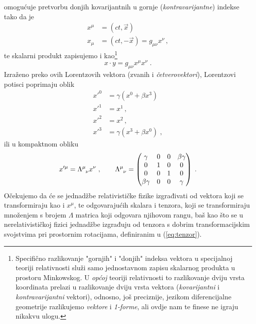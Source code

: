 omogućuje pretvorbu donjih kovarijantnih u gornje (\emph{kontravarijantne})
indekse tako da je
\begin{align}
x^\mu &= (ct, \vec{x}) \\
x_\mu &= (ct,-\vec{x}) = g_{\mu\nu} x^\nu \,,
\end{align}
te skalarni produkt zapisujemo i kao\footnote{Specifično 
razlikovanje "gornjih" i "donjih" indeksa vektora u
specijalnoj teoriji relativnosti služi samo jednostavnom zapisu
skalarnog produkta u prostoru Minkowskog.
U \emph{općoj} teoriji relativnosti to razlikovanje dviju vrsta
koordinata prelazi u razlikovanje dviju vrsta vektora 
(\emph{kovarijantni} i \emph{kontravarijantni} vektori), odnosno,
još preciznije, jezikom diferencijalne geometrije razlikujemo 
\emph{vektore} i \emph{1-forme}, ali ovdje nam te finese ne igraju
nikakvu ulogu.}
\begin{equation}
     x \cdot y = g_{\mu\nu} x^{\mu}x^{\nu} \;.
\end{equation}
Izraženo preko ovih Lorentzovih vektora (zvanih i \emph{četverovektori}),
Lorentzovi potisci poprimaju oblik 
\begin{align}
x'^{0} &= \gamma (x^0 + \beta x^3 ) \\
x'^{1} &= x^1 \,, \\
x'^{2} &= x^2 \,, \\
x'^{3} &= \gamma (x^3 +\beta x^0 ) \;,
\end{align}
ili u kompaktnom obliku
\begin{equation}
    x'^{\mu} = \tensor{\Lambda}{^{\mu}_{\nu}} x^\nu \;, \qquad
\tensor{\Lambda}{^{\mu}_{\nu}} =
\begin{pmatrix}
\gamma & 0 & 0 & \beta\gamma \\
0 & 1 & 0 & 0 \\
0 & 0 & 1 & 0 \\
\beta\gamma & 0 & 0 & \gamma
\end{pmatrix} \;.
\label{eq:deflambda}
\end{equation}
Očekujemo da će se jednadžbe
relativističke fizike izgrađivati od vektora koji se transformiraju
kao i $x^{\mu}$, te odgovarajućih
skalara i tenzora, koji se transformiraju množenjem s brojem $\Lambda$ matrica
koji odgovara njihovom rangu, baš kao što se u nerelativističkoj fizici jednadžbe
izgrađuju od tenzora s dobrim transformacijskim svojstvima pri prostornim rotacijama,
definiranim u (\ref{eq:tenzor}).

